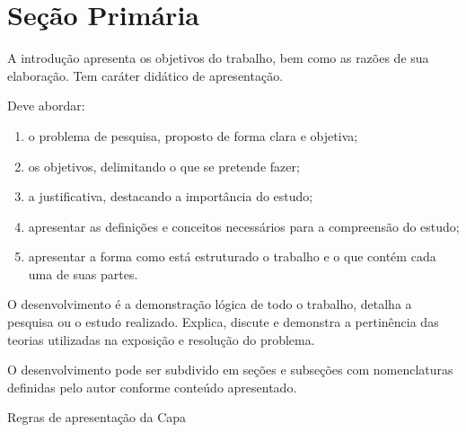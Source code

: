 


\chapter{Seção Primária}

A introdução apresenta os objetivos do trabalho, bem como as razões de sua elaboração. Tem caráter didático de apresentação.

Deve abordar:
\begin{enumerate}[noitemsep,nosep,labelindent=\parindent,leftmargin=*,label={\alph*}) ] 
	\item o problema de pesquisa, proposto de forma clara e objetiva;
	\item os objetivos, delimitando o que se pretende fazer;
	\item a justificativa, destacando a importância do estudo;
	\item apresentar as definições e conceitos necessários para a compreensão do estudo;
	\item apresentar a forma como está estruturado o trabalho e o que contém cada uma de suas partes.
\end{enumerate}

O desenvolvimento é a demonstração lógica de todo o trabalho, detalha a pesquisa ou o estudo realizado. Explica, discute e demonstra a pertinência das teorias utilizadas na exposição e resolução do problema. 

O desenvolvimento pode ser subdivido em seções e subseções com nomenclaturas definidas pelo autor conforme conteúdo apresentado. 

Regras de apresentação da Capa




